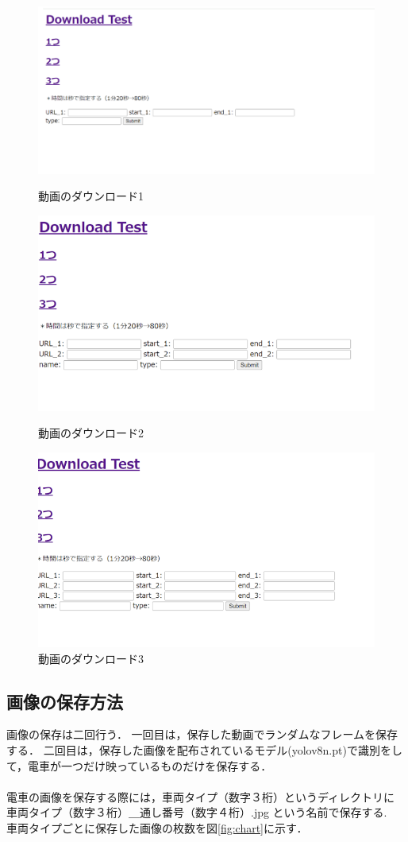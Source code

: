 \begin{figure}
	\centering
	\includegraphics [width=\linewidth]{chap3/fig/test1.png}
	\caption{動画のダウンロード1}
	\label{test1}

	
	\includegraphics [width=0.9\linewidth]{chap3/fig/test2.png}
	\caption{動画のダウンロード2}
	\label{test2}
	
	\includegraphics [width=0.9\linewidth]{chap3/fig/test3.png}
	\caption{動画のダウンロード3}
	\label{test3}
\end{figure}

\subsection{画像の保存方法}
画像の保存は二回行う．
一回目は，保存した動画でランダムなフレームを保存する．
二回目は，保存した画像を配布されているモデル(yolov8n.pt)で識別をして，電車が一つだけ映っているものだけを保存する．\\
\\
電車の画像を保存する際には，車両タイプ（数字３桁）というディレクトリに\\
車両タイプ（数字３桁）＿通し番号（数字４桁）.jpg    という名前で保存する.\\
車両タイプごとに保存した画像の枚数を図\ref{fig:chart}に示す．

